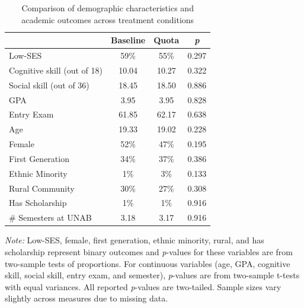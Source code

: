 \documentclass[11pt,a4paper,oneside]{article}
\begin{document}
\begin{table}[!htbp]
\centering
\begin{threeparttable}
\caption{Comparison of demographic characteristics and academic outcomes across treatment conditions}
\begin{tabular*}{0.85\textwidth}{@{\extracolsep{\fill}}lcc c@{}}
\toprule
 & \multicolumn{1}{c}{\textbf{Baseline}} & \multicolumn{1}{c}{\textbf{Quota}} & \multicolumn{1}{c}{\textit{\textbf{p}}} \\ \midrule
Low-SES & 59\% & 55\% & \multicolumn{1}{c}{0.297} \\
Cognitive skill (out of 18) & 10.04 & 10.27 & \multicolumn{1}{c}{0.322} \\
Social skill (out of 36) & 18.45 & 18.50 & \multicolumn{1}{c}{0.886} \\
GPA & 3.95 & 3.95 & \multicolumn{1}{c}{0.828} \\
Entry Exam & 61.85 & 62.17 & \multicolumn{1}{c}{0.638} \\
Age & 19.33 & 19.02 & \multicolumn{1}{c}{0.228} \\
Female & 52\% & 47\% & \multicolumn{1}{c}{0.195} \\
First Generation & 34\% & 37\% & \multicolumn{1}{c}{0.386} \\
Ethnic Minority & 1\% & 3\% & \multicolumn{1}{c}{0.133} \\
Rural Community & 30\% & 27\% & \multicolumn{1}{c}{0.308} \\
Has Scholarship & 1\% & 1\% & \multicolumn{1}{c}{0.916} \\
\# Semesters at UNAB & 3.18 & 3.17 & \multicolumn{1}{c}{0.916} \\
\bottomrule
\end{tabular*}
\begin{tablenotes}[flushleft]
\footnotesize
\item[] \textit{Note:} Low-SES, female, first generation, ethnic minority, rural, and has scholarship represent binary outcomes and \textit{p}-values for these variables are from two-sample tests of proportions. For continuous variables (age, GPA, cognitive skill, social skill, entry exam, and semester), \textit{p}-values are from two-sample t-tests with equal variances. All reported \textit{p}-values are two-tailed. Sample sizes vary slightly across measures due to missing data.
\end{tablenotes}
\label{tab:demographic-comparison}
\end{threeparttable}
\end{table}
\end{document}

